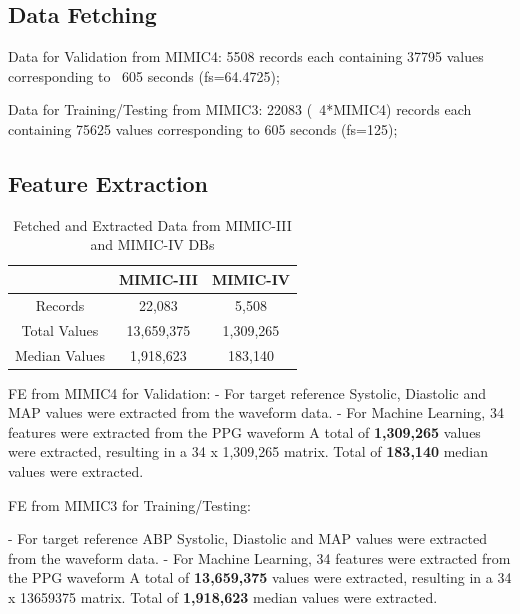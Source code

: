 \subsection{Data Fetching}
\label{subsec:data_fetching}

Data for Validation from MIMIC4:
5508 records each containing 37795 values corresponding to ~605 seconds (fs=64.4725);

Data for Training/Testing from MIMIC3:
22083 (~4*MIMIC4) records each containing 75625 values corresponding to 605 seconds (fs=125);

\subsection{Feature Extraction}
\label{subsec:feature_extraction}

\begin{table}{\textwidth}
    \renewcommand{\arraystretch}{1.5}
    \setlength{\tabcolsep}{12pt}
    \begin{center}
        \begin{tabular}{ |c|c|c| }
            \hline
            & MIMIC-III  & MIMIC-IV  \\
            \hline
            Records       & 22,083     & 5,508     \\
            \hline
            Total Values  & 13,659,375 & 1,309,265 \\
            \hline
            Median Values & 1,918,623  & 183,140   \\
            \hline
        \end{tabular}
    \end{center}
    \captionsetup{format=plain, justification=centering}
    \caption{Fetched and Extracted Data from MIMIC-III and MIMIC-IV DBs}
    \label{tab:records}
\end{table}

FE from MIMIC4 for Validation:
- For target reference Systolic, Diastolic and MAP values were extracted from the waveform data.
- For Machine Learning, 34 features were extracted from the PPG waveform
A total of \textbf{1,309,265} values were extracted, resulting in a 34 x 1,309,265 matrix.
Total of \textbf{183,140} median values were extracted.

FE from MIMIC3 for Training/Testing:

- For target reference ABP Systolic, Diastolic and MAP values were extracted from the waveform data.
- For Machine Learning, 34 features were extracted from the PPG waveform
A total of \textbf{13,659,375} values were extracted, resulting in a 34 x 13659375 matrix.
Total of \textbf{1,918,623} median values were extracted.

